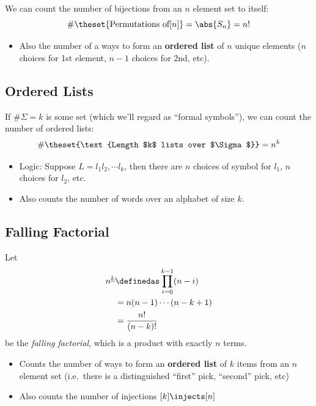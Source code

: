 We can count the number of bijections from an \(n\) element set to
itself: \[ \#\theset{\text{Permutations of} [n]} = \abs{S_n}  = n! \]

\begin{itemize}
\tightlist
\item
  Also the number of a ways to form an \textbf{ordered list} of \(n\)
  unique elements (\(n\) choices for 1st element, \(n-1\) choices for
  2nd, etc).
\end{itemize}

\hypertarget{ordered-lists}{%
\subsection{Ordered Lists}\label{ordered-lists}}

If \(\#\Sigma = k\) is some set (which we'll regard as ``formal
symbols''), we can count the number of ordered lists: \[
\# \theset{\text{Length $k$ lists over $\Sigma$}} = n^k
\]

\begin{itemize}
\tightlist
\item
  Logic: Suppose \(L = l_1 l_2, \cdots l_k\), then there are \(n\)
  choices of symbol for \(l_1\), \(n\) choices for \(l_2\), etc.
\item
  Also counts the number of words over an alphabet of size \(k\).
\end{itemize}

\hypertarget{falling-factorial}{%
\subsection{Falling Factorial}\label{falling-factorial}}

Let \[\begin{aligned}
n^{\underline k} &\definedas \prod_{i=0}^{k-1}(n - i) \\
&= n(n-1)\cdots (n-k+1) \\
&= \frac{n!}{(n-k)!}
\end{aligned}\] be the \emph{falling factorial}, which is a product with
exactly \(n\) terms.

\begin{itemize}
\tightlist
\item
  Counts the number of ways to form an \textbf{ordered list} of \(k\)
  items from an \(n\) element set (i.e.~there is a distinguished
  ``first'' pick, ``second'' pick, etc)
\item
  Also counts the number of injections \([k] \injects [n]\)
\end{itemize}


